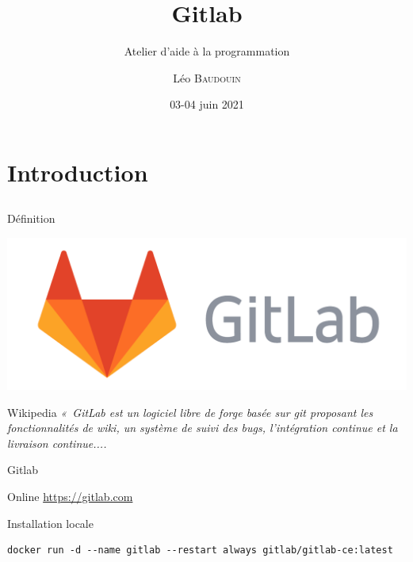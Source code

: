 \documentclass{beamer}
\title{Gitlab}
\subtitle{Atelier d'aide à la programmation}
\author{L\'eo \textsc{Baudouin}}
\institute{
  {\url{baudouin.leo @ gmail.com}}
}
\date{03-04 juin 2021}
\begin{document}
\begin{frame}
  \titlepage
\end{frame}

\section{Introduction}
\subsection{}

\begin{frame}{Définition}


\begin{center}
\includegraphics[width=0.5\linewidth]{images/gitlab-logo}
\end{center}

\begin{block}{Wikipedia}
{\it 
«~GitLab est un logiciel libre de forge basée sur git proposant les fonctionnalités de wiki, un système de suivi des bugs, l’intégration continue et la livraison continue....}
\end{block}
\end{frame}



\begin{frame}[fragile]{Gitlab}

\begin{block}{Online}
\href{https://gitlab.com}{https://gitlab.com}
\end{block}

\begin{block}{Installation locale}
\scriptsize
\begin{verbatim}
docker run -d --name gitlab --restart always gitlab/gitlab-ce:latest
\end{verbatim}
\end{block}


\end{frame}
\end{document}

